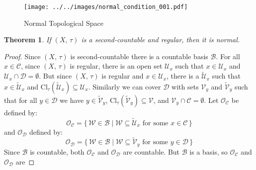 \documentclass{article}
\theoremstyle{plain}
\newtheorem{theorem}{Theorem}[section]
\theoremstyle{normal}
\begin{document}
        \begin{figure}
            \centering
            \texttt{[image: ../../images/normal\_condition\_001.pdf]}
            \caption{Normal Topological Space}
            \label{fig:normal_condition_001}
        \end{figure}
        \begin{theorem}
            If $(X,\,\tau)$ is a second-countable and regular, then it is
            normal.
        \end{theorem}
        \begin{proof}
            Since $(X,\,\tau)$ is second-countable there is a countable basis
            $\mathcal{B}$. For all $x\in\mathcal{C}$, since $(X,\,\tau)$ is
            regular, there is an open set $\mathcal{U}_{x}$ such that
            $x\in\mathcal{U}_{x}$ and
            $\mathcal{U}_{x}\cap\mathcal{D}=\emptyset$. But since
            $(X,\,\tau)$ is regular and $x\in\mathcal{U}_{x}$, there is a
            $\tilde{\mathcal{U}}_{x}$ such that $x\in\tilde{\mathcal{U}}_{x}$
            and $\textrm{Cl}_{\tau}(\tilde{\mathcal{U}}_{x})\subseteq\mathcal{U}_{x}$.
            Similarly we can cover $\mathcal{D}$ with sets
            $\mathcal{V}_{y}$ and $\tilde{\mathcal{V}}_{y}$ such that for all
            $y\in\mathcal{D}$ we have
            $y\in\tilde{\mathcal{V}}_{y}$,
            $\textrm{Cl}_{\tau}(\tilde{\mathcal{V}}_{y})\subseteq\mathcal{V}$,
            and $\mathcal{V}_{y}\cap\mathcal{C}=\emptyset$. Let
            $\mathcal{O}_{\mathcal{C}}$ be
            defined by:
            \begin{equation}
                \mathcal{O}_{\mathcal{C}}
                =\{\,\mathcal{W}\in\mathcal{B}\;|\;
                    \mathcal{W}\subseteq\tilde{\mathcal{U}}_{x}
                    \textrm{ for some }x\in\mathcal{C}\,\}
            \end{equation}
            and $\mathcal{O}_{\mathcal{D}}$ defined by:
            \begin{equation}
                \mathcal{O}_{\mathcal{D}}
                =\{\,\mathcal{W}\in\mathcal{B}\;|\;
                    \mathcal{W}\subseteq\tilde{\mathcal{V}}_{y}
                    \textrm{ for some }y\in\mathcal{D}\,\}
            \end{equation}
            Since $\mathcal{B}$ is countable, both
            $\mathcal{O}_{\mathcal{C}}$ and $\mathcal{O}_{\mathcal{D}}$ are
            countable. But $\mathcal{B}$ is a basis, so
            $\mathcal{O}_{\mathcal{C}}$ and $\mathcal{O}_{\mathcal{D}}$ are

\end{proof}
\end{document}
